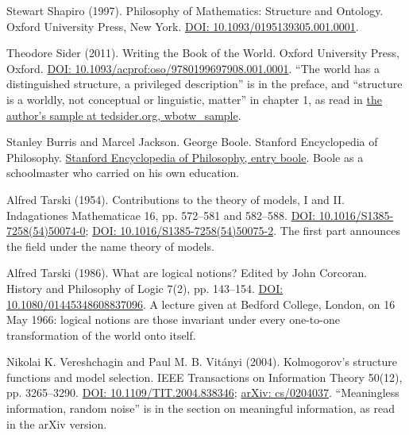 \documentclass[11pt,twoside]{article}
\theoremstyle{thielethm}
\theoremstyle{thieledef}
\theoremstyle{thieledef}
\theoremstyle{thieledef}
\theoremstyle{thielethm}
\theoremstyle{thieleobs}
\theoremstyle{thielethm}
\begin{document}
\noindent Stewart Shapiro (1997). Philosophy of Mathematics: Structure and Ontology. Oxford University Press, New York. \href{https://doi.org/10.1093/0195139305.001.0001}{DOI: 10.1093/0195139305.001.0001}.
\par\medskip

\noindent Theodore Sider (2011). Writing the Book of the World. Oxford University Press, Oxford. \href{https://doi.org/10.1093/acprof:oso/9780199697908.001.0001}{DOI: 10.1093/acprof:oso/9780199697908.001.0001}. ``The world has a distinguished structure, a privileged description'' is in the preface, and ``structure is a worldly, not conceptual or linguistic, matter'' in chapter 1, as read in \href{https://www.tedsider.org/books/wbotw_sample.pdf}{the author's sample at tedsider.org, wbotw\_sample}.
\par\medskip

\noindent Stanley Burris and Marcel Jackson. George Boole. Stanford Encyclopedia of Philosophy. \href{https://plato.stanford.edu/entries/boole/}{Stanford Encyclopedia of Philosophy, entry boole}. Boole as a schoolmaster who carried on his own education.
\par\medskip

\noindent Alfred Tarski (1954). Contributions to the theory of models, I and II. Indagationes Mathematicae 16, pp. 572--581 and 582--588. \href{https://doi.org/10.1016/S1385-7258(54)50074-0}{DOI: 10.1016/S1385-7258(54)50074-0}; \href{https://doi.org/10.1016/S1385-7258(54)50075-2}{DOI: 10.1016/S1385-7258(54)50075-2}. The first part announces the field under the name theory of models.
\par\medskip

\noindent Alfred Tarski (1986). What are logical notions? Edited by John Corcoran. History and Philosophy of Logic 7(2), pp. 143--154. \href{https://doi.org/10.1080/01445348608837096}{DOI: 10.1080/01445348608837096}. A lecture given at Bedford College, London, on 16 May 1966: logical notions are those invariant under every one-to-one transformation of the world onto itself.
\par\medskip

\noindent Nikolai K. Vereshchagin and Paul M. B. Vit\'anyi (2004). Kolmogorov's structure functions and model selection. IEEE Transactions on Information Theory 50(12), pp. 3265--3290. \href{https://doi.org/10.1109/TIT.2004.838346}{DOI: 10.1109/TIT.2004.838346}; \href{https://arxiv.org/abs/cs/0204037}{arXiv: cs/0204037}. ``Meaningless information, random noise'' is in the section on meaningful information, as read in the arXiv version.
\par\medskip
\end{document}
